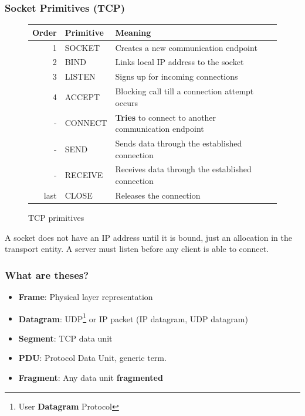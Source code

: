   \begin{frame}
    \frametitle{Socket Primitives (TCP)}
    \begin{figure}
      \centering
      \resizebox{10cm}{!} {
        \begin{tabular}{r|l|l}
          Order & Primitive & Meaning \\ \hline
          1     & SOCKET    & Creates a new communication endpoint \\ \hline
          2     & BIND      & Links local IP address to the socket \\ \hline
          3     & LISTEN    & Signs up for incoming connections \\ \hline
          4     & ACCEPT    & Blocking call till a connection attempt occurs \\ \hline
          -     & CONNECT   & \textbf{Tries} to connect to another communication endpoint \\ \hline
          -     & SEND      & Sends data through the established connection \\ \hline
          -     & RECEIVE   & Receives data through the established connection \\ \hline
          last  & CLOSE     & Releases the connection \\ \hline
        \end{tabular}
      }
      \caption{TCP primitives}
      \label{fig:primitives}
    \end{figure}
    A socket does not have an IP address until it is bound, just an allocation in the transport entity. A server must listen before any client is able to connect.
  \end{frame}

  \begin{frame}
    \frametitle{What are theses?}
      \begin{itemize}
        \item \textbf{Frame}: Physical layer representation
        \item \textbf{Datagram}: UDP\footnote{User \textbf{Datagram} Protocol} or IP packet (IP datagram, UDP datagram)
        \item \textbf{Segment}: TCP data unit
        \item \textbf{PDU}: Protocol Data Unit, generic term.
        \item \textbf{Fragment}: Any data unit \textbf{fragmented}
      \end{itemize}
  \end{frame}